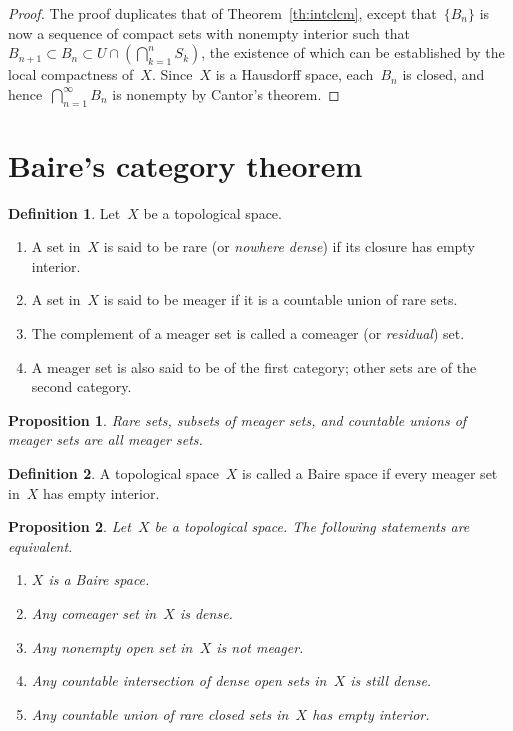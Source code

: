 \documentclass[11pt,a4paper]{article}
\newtheorem{proposition}{Proposition}[section]
\theoremstyle{definition}
\newtheorem{definition}{Definition}[section]
\numberwithin{equation}{section}
\begin{document}
\begin{proof}
  The proof duplicates that of Theorem~\ref{th:intclcm}, except that~$\{B_n\}$ is now a sequence of
  compact sets with nonempty interior such that 
  $B_{n+1} \subset B_n \subset U \cap (\bigcap_{k=1}^n S_k)$, the existence of which can be
 established by the local compactness of~$X$.  Since~$X$ is a Hausdorff space, each~$B_n$ is closed,
 and hence~$\bigcap_{n=1}^\infty B_n$ is nonempty by Cantor's theorem. 
\end{proof}

\section{Baire's category theorem}

\begin{definition}
Let~$X$ be a topological space. 
\begin{enumerate}
  \item A set in~$X$ is said to be rare (or \emph{nowhere dense}) if its closure has empty interior.  
  \item A set in~$X$ is said to be meager if it is a countable union of rare sets.
  \item The complement of a meager set is called a comeager (or \emph{residual}) set.
  \item A meager set is also said to be of the first category; other sets are  
    of the second category.
\end{enumerate}
\end{definition}


\begin{proposition}
 Rare sets, subsets of meager sets, and countable unions of meager sets are all meager sets. 
\end{proposition}


\begin{definition}
  A topological space~$X$ is called a Baire space if every meager set in~$X$ has empty interior.
\end{definition}

\begin{proposition} 
   Let~$X$ be a topological space. The following statements are equivalent.  
  \begin{enumerate}
    \item $X$ is a Baire space.
    \item Any comeager set in~$X$ is dense.
    \item Any nonempty open set in~$X$ is not meager.
    \item Any countable intersection of dense open sets in~$X$ is still dense.
    \item Any countable union of rare closed sets in~$X$ has empty interior.
\end{enumerate}
\end{proposition}
\end{document}
